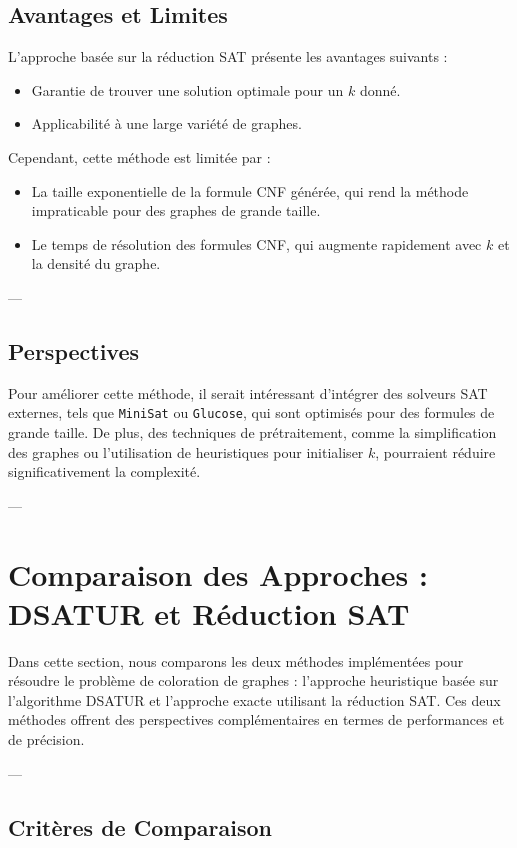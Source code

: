 \documentclass[11pt]{article}
\begin{document}
\subsection{Avantages et Limites}

L'approche basée sur la réduction SAT présente les avantages suivants :
\begin{itemize}
    \item Garantie de trouver une solution optimale pour un \(k\) donné.
    \item Applicabilité à une large variété de graphes.
\end{itemize}

Cependant, cette méthode est limitée par :
\begin{itemize}
    \item La taille exponentielle de la formule CNF générée, qui rend la méthode impraticable pour des graphes de grande taille.
    \item Le temps de résolution des formules CNF, qui augmente rapidement avec \(k\) et la densité du graphe.
\end{itemize}
---
\subsection{Perspectives}

Pour améliorer cette méthode, il serait intéressant d'intégrer des solveurs SAT externes, tels que \texttt{MiniSat} ou \texttt{Glucose}, qui sont optimisés pour des formules de grande taille. De plus, des techniques de prétraitement, comme la simplification des graphes ou l'utilisation de heuristiques pour initialiser \(k\), pourraient réduire significativement la complexité.

---
\section{Comparaison des Approches : DSATUR et Réduction SAT}

Dans cette section, nous comparons les deux méthodes implémentées pour résoudre le problème de coloration de graphes : l'approche heuristique basée sur l'algorithme DSATUR et l'approche exacte utilisant la réduction SAT. Ces deux méthodes offrent des perspectives complémentaires en termes de performances et de précision.

---

\subsection{Critères de Comparaison}
\end{document}
